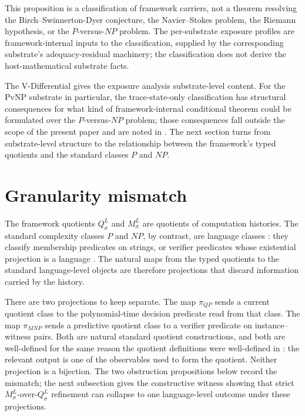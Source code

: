 \documentclass[11pt]{article}
\newcommand{\Substrate}{\sigma}             \newcommand{\Lift}{L}                       \newcommand{\LiftState}{\sigma_{L}}         \newcommand{\HistorySpace}{H_{\Substrate}^{\Lift}}
\newcommand{\Qquotient}{Q_{\Substrate}^{\Lift}}
\newcommand{\Mquotient}{M_{\Substrate}^{\Lift}}
\newcommand{\PiQP}{\pi_{QP}}                \newcommand{\PiMNP}{\pi_{MNP}}
\theoremstyle{definition}
\begin{document}
This proposition is a classification of framework carriers, not a
theorem resolving the Birch--Swinnerton-Dyer conjecture, the
Navier--Stokes problem, the Riemann hypothesis, or the \(P\)-versus-\(NP\)
problem.  The per-substrate exposure profiles are framework-internal
inputs to the classification, supplied by the corresponding substrate's
adequacy-residual machinery; the classification does not derive the
host-mathematical substrate facts.

The V-Differential gives the exposure analysis substrate-level content.
For the PvNP substrate in particular, the trace-state-only
classification has structural consequences for what kind of
framework-internal conditional theorem could be formulated over the
\(P\)-versus-\(NP\) problem; those consequences fall outside the scope of
the present paper and are noted in .
The next section turns from substrate-level structure to the
relationship between the framework's typed quotients and the standard
classes \(P\) and \(NP\).
 

\section{Granularity mismatch}
\label{sec:granularity-mismatch}

The framework quotients \(\Qquotient\) and \(\Mquotient\) are quotients
of computation histories.  The standard complexity classes \(P\) and
\(NP\), by contrast, are language classes
\citep{AroraBarak2009Complexity}: they classify membership predicates on
strings, or verifier predicates whose existential projection is a
language \citep{Cook2000PNPClay}.  The natural maps from the typed quotients to
the standard language-level objects are therefore projections that
discard information carried by the history.

There are two projections to keep separate.  The map \(\PiQP\) sends a
current quotient class to the polynomial-time decision predicate read
from that class.  The map \(\PiMNP\) sends a predictive quotient class
to a verifier predicate on instance--witness pairs.  Both are natural
standard quotient constructions, and both are well-defined for the
same reason the quotient definitions were well-defined in
: the relevant output is one of the observables
used to form the quotient.  Neither projection is a bijection.  The
two obstruction propositions below record the mismatch; the next
subsection gives the constructive witness showing that strict
\(\Mquotient\)-over-\(\Qquotient\) refinement can collapse to one
language-level outcome under these projections.
\end{document}
